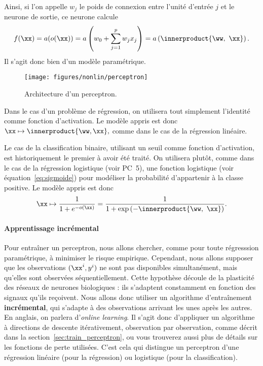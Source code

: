Ainsi, si l'on appelle $w_j$ le poids de connexion entre l'unité d'entrée $j$
et le neurone de sortie, ce neurone calcule
\begin{equation}
  \label{eq:perceptron_sortie}
  f(\xx) = a(o(\xx)) = a\left(w_0 + \sum_{j=1}^p w_j x_j \right) 
  = a\left(\innerproduct{\ww,~\xx} \right).
\end{equation}
Il s'agit donc bien d'un modèle paramétrique.

\begin{figure}[h]
  \centering
  \texttt{[image: figures/nonlin/perceptron]}
  \caption{Architecture d'un perceptron. }
  \label{fig:perceptron}
\end{figure}

Dans le cas d'un problème de régression, on utilisera tout simplement l'identité comme fonction d'activation. Le modèle appris est donc $\xx \mapsto \innerproduct{\ww, \xx},$ comme dans le cas de la régression linéaire.

Le cas de la classification binaire, utilisant un seuil comme fonction
d'activation, est historiquement le premier à avoir été traité.  On utilisera
plutôt, comme dans le cas de la régression logistique (voir PC~5), une fonction
logistique (voir équation~\eqref{eq:sigmoide}) pour modéliser la probabilité
d'appartenir à la classe positive. Le modèle appris est donc
\begin{equation}
  \xx \mapsto \frac1{1 + e^{- o(\xx)}} = 
  \frac1{1 + \exp \left( - \innerproduct{\ww,~\xx} \right)}.
\end{equation}


\paragraph{Apprentissage incrémental} Pour entraîner un perceptron, nous
allons chercher, comme pour toute régresssion paramétrique, à minimiser le
risque empirique.  Cependant, nous allons supposer que les observations
$(\xx^i, y^i)$ ne sont pas disponibles simultanément, mais qu'elles sont
observées séquentiellement. Cette hypothèse découle de la plasticité des
réseaux de neurones biologiques : ils s'adaptent constamment en fonction des
signaux qu'ils reçoivent. Nous allons donc utiliser un algorithme
d'entraînement \textbf{incrémental}, qui s'adapte à des observations arrivant
les unes après les autres. En anglais, on parlera d'\textit{online
  learning}. Il s'agit donc d'appliquer un algorithme à directions de descente
itérativement, observation par observation, comme décrit dans la
section~\ref{sec:train_perceptron}, ou vous trouverez aussi plus de détails sur
les fonctions de perte utilisées. 
C'est cela qui distingue un perceptron d'une régression linéaire (pour la
régression) ou logistique (pour la classification).

